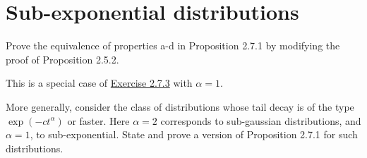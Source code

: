 \section{Sub-exponential distributions}
\begin{problem*}[Exercise 2.7.2]\label{ex2.7.2}
	Prove the equivalence of properties a-d in Proposition 2.7.1 by modifying the proof of Proposition 2.5.2.
\end{problem*}
\begin{answer}
	This is a special case of \hyperref[ex2.7.3]{Exercise 2.7.3}  with \(\alpha = 1\).
\end{answer}

\begin{problem*}[Exercise 2.7.3]\label{ex2.7.3}
	More generally, consider the class of distributions whose tail decay is of the type \(\exp (-ct^\alpha )\) or faster. Here \(\alpha = 2\) corresponds to sub-gaussian distributions, and \(\alpha = 1\), to sub-exponential. State and prove a version of Proposition 2.7.1 for such distributions.
\end{problem*}
